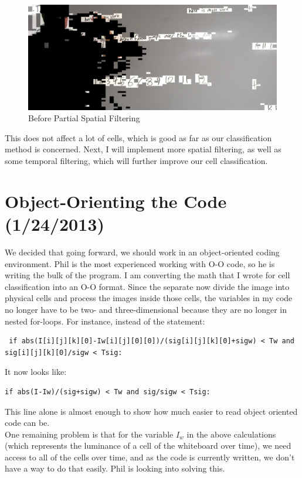 \documentclass[]{article}
\begin{document}
\begin{figure}[H]
\centering
\includegraphics[scale=0.2]{images/beforeSpatial1}
\caption{Before Partial Spatial Filtering}
\end{figure}	
This does not affect a lot of cells, which is good as far as our classification method is concerned.  Next, I will implement more spatial filtering, as well as some temporal filtering, which will further improve our cell classification.
	\section{Object-Orienting the Code (1/24/2013)}	
		We decided that going forward, we should work in an object-oriented coding environment.  Phil is the most experienced working with O-O code, so he is writing the bulk of the program.  I am converting the math that I wrote for cell classification into an O-O format.  Since the separate now divide the image into physical cells and process the images inside those cells, the variables in my code no longer have to be two- and three-dimensional because they are no longer in nested for-loops.  For instance, instead of the statement:
\begin{verbatim}
 if abs(I[i][j][k][0]-Iw[i][j][0][0])/(sig[i][j][k][0]+sigw) < Tw and sig[i][j][k][0]/sigw < Tsig:
\end{verbatim}
It now looks like:
\begin{verbatim}
if abs(I-Iw)/(sig+sigw) < Tw and sig/sigw < Tsig:
\end{verbatim}
This line alone is almost enough to show how much easier to read object oriented code can be.  
\\
One remaining problem is that for the variable $I_w$ in the above calculations (which represents the luminance of a cell of the whiteboard over time), we need access to all of the cells over time, and as the code is currently written, we don't have a way to do that easily. Phil is looking into solving this.
	
\end{document}
